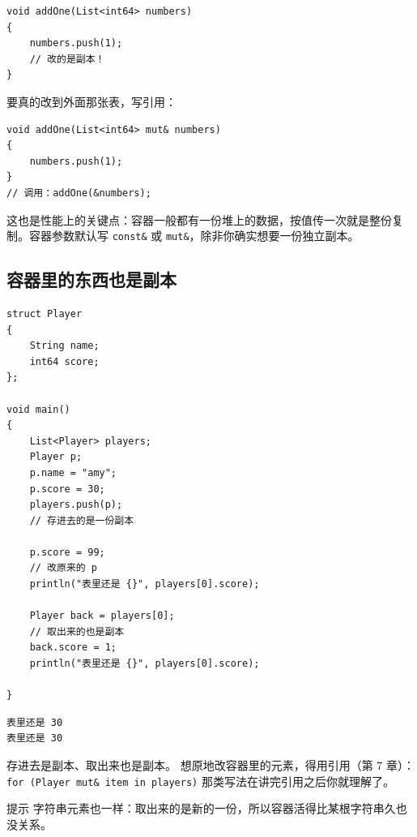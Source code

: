 \par
\medskip
\begin{lstlisting}[style=chali]
void addOne(List<int64> numbers)
{
    numbers.push(1);
    // 改的是副本！
}
\end{lstlisting}
\par
\medskip

要真的改到外面那张表，写引用：

\par
\medskip
\begin{lstlisting}[style=chali]
void addOne(List<int64> mut& numbers)
{
    numbers.push(1);
}
// 调用：addOne(&numbers);
\end{lstlisting}
\par
\medskip

这也是性能上的关键点：容器一般都有一份堆上的数据，按值传一次就是整份复制。容器参数默认写 \texttt{const\&} 或 \texttt{mut\&}，除非你确实想要一份独立副本。

\subsection*{容器里的东西也是副本}

\par
\medskip
\begin{lstlisting}[style=chali]
struct Player
{
    String name;
    int64 score;
};

void main()
{
    List<Player> players;
    Player p;
    p.name = "amy";
    p.score = 30;
    players.push(p);
    // 存进去的是一份副本

    p.score = 99;
    // 改原来的 p
    println("表里还是 {}", players[0].score);

    Player back = players[0];
    // 取出来的也是副本
    back.score = 1;
    println("表里还是 {}", players[0].score);

}
\end{lstlisting}
\par
\medskip

\par
\medskip
\begin{lstlisting}[style=out]
表里还是 30
表里还是 30
\end{lstlisting}
\par
\medskip

存进去是副本、取出来也是副本。 想原地改容器里的元素，得用引用（第 7 章）：\texttt{for (\allowbreak{}Player mut\& item in players)\allowbreak{}} 那类写法在讲完引用之后你就理解了。

\begin{tip}{提示}
字符串元素也一样：取出来的是新的一份，所以容器活得比某根字符串久也没关系。
\end{tip}

